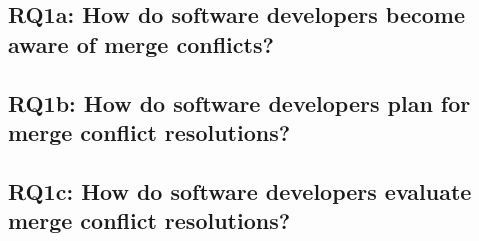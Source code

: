 \subsection{\textbf{RQ1a:} How do software developers become aware of merge conflicts?}\label{RQ1a}

\subsection{\textbf{RQ1b:} How do software developers plan for merge conflict resolutions?}\label{RQ1b}

\subsection{\textbf{RQ1c:} How do software developers evaluate merge conflict resolutions?}\label{RQ1c}